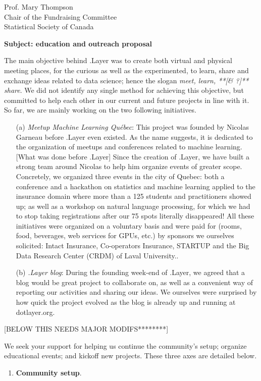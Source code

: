 \documentclass[11pt, a4paper]{letter} %
\begin{document}
\begin{letter}{
	Prof. Mary Thompson\\
	Chair of the Fundraising Committee\\
	Statistical Society of Canada
	
	\bigskip
	\textbf{Subject: education and outreach proposal}%
}
The main objective behind .Layer was to create both virtual and physical meeting places, for the curious as well as the experimented, to learn, share and exchange ideas related to data science; hence the slogan \emph{meet, learn, **[\& ?]** share}. We did not identify any single method for achieving this objective, but committed to help each other in our current and future projects in line with it. So far, we are mainly working on the two following initiatives.
\begin{enumerate}
	\item[(a)] \emph{Meetup Machine Learning Québec}: This project was founded by Nicolas Garneau before .Layer even existed. As the name suggests, it is dedicated to the organization of meetups and conferences related to machine learning. [What was done before .Layer] Since the creation of .Layer, we have built a strong team around Nicolas to help him organize events of greater scope. Concretely, we organized three events in the city of Quebec: both a conference and a hackathon on statistics and machine learning applied to the insurance domain where more than a 125 students and practitioners showed up; as well as a workshop on natural language processing, for which we had to stop taking registrations after our 75 spots literally disappeared! All these initiatives were organized on a voluntary basis and were paid for (rooms, food, beverages, web services for GPUs, etc.) by sponsors we ourselves solicited: Intact Insurance, Co-operators Insurance, STARTUP and the Big Data Research Center (CRDM) of Laval University..
	\item[(b)] \emph{.Layer blog}: During the founding week-end of .Layer, we agreed that a blog would be great project to collaborate on, as well as a convenient way of reporting our activities and sharing our ideas. We ourselves were surprised by how quick the project evolved as the blog is already up and running at dotlayer.org. 
\end{enumerate}

\bigskip

[BELOW THIS NEEDS MAJOR MODIFS********]

\bigskip



We seek your support for helping us continue the community's setup; organize educational events; and kickoff new projects. These three axes are detailed below.

\begin{enumerate}
	\item \textbf{Community setup}.
	

\end{enumerate}
\end{letter}
\end{document}
